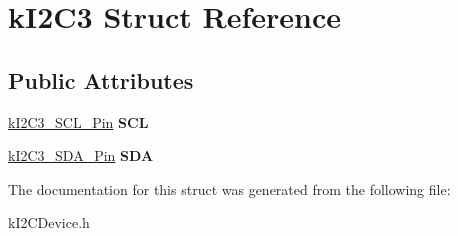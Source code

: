 \hypertarget{structkI2C3}{}\section{k\+I2\+C3 Struct Reference}
\label{structkI2C3}
\subsection*{Public Attributes}
\begin{DoxyCompactItemize}
\item 
\hyperlink{structkI2C3__SCL__Pin}{k\+I2\+C3\+\_\+\+S\+C\+L\+\_\+\+Pin} {\bfseries S\+CL}\hypertarget{structkI2C3_a4d3320e6a2554446714e9c24dc769663}{}\label{structkI2C3_a4d3320e6a2554446714e9c24dc769663}

\item 
\hyperlink{structkI2C3__SDA__Pin}{k\+I2\+C3\+\_\+\+S\+D\+A\+\_\+\+Pin} {\bfseries S\+DA}\hypertarget{structkI2C3_ac687d9e2fa7c15455bf2a489a440eafb}{}\label{structkI2C3_ac687d9e2fa7c15455bf2a489a440eafb}

\end{DoxyCompactItemize}


The documentation for this struct was generated from the following file\+:\begin{DoxyCompactItemize}
\item 
k\+I2\+C\+Device.\+h\end{DoxyCompactItemize}
